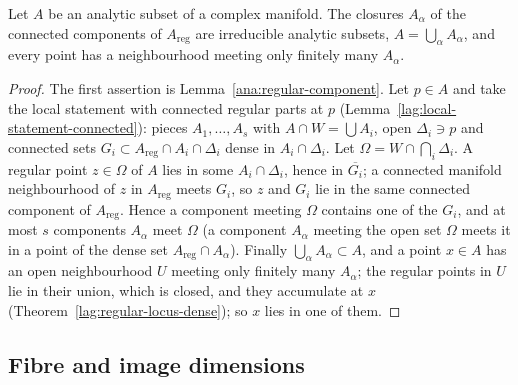 \begin{lemma}
\label{rem:global-components}
\leanok
Let \(A\) be an analytic subset of a complex manifold. The closures \(A_\alpha\) of the connected components of \(A_{\mathrm{reg}}\) are irreducible analytic
subsets, \(A=\bigcup_\alpha A_\alpha\), and every point has a neighbourhood meeting only finitely many \(A_\alpha\).
\end{lemma}
\begin{proof}
\leanok
The first assertion is Lemma~\ref{ana:regular-component}. Let \(p\in A\) and take the local statement
with connected regular parts at \(p\) (Lemma~\ref{lag:local-statement-connected}): pieces \(A_1,\dots,A_s\) with \(A\cap W=\bigcup A_i\), open \(\Delta_i\ni p\) and
connected sets \(G_i\subset A_{\mathrm{reg}}\cap A_i\cap\Delta_i\) dense in \(A_i\cap\Delta_i\). Let \(\Omega=W\cap\bigcap_i\Delta_i\). A regular point \(z\in\Omega\)
of \(A\) lies in some \(A_i\cap\Delta_i\), hence in \(\overline{G_i}\); a connected manifold neighbourhood of \(z\) in \(A_{\mathrm{reg}}\) meets \(G_i\), so \(z\) and
\(G_i\) lie in the same connected component of \(A_{\mathrm{reg}}\). Hence a component meeting \(\Omega\) contains one of the \(G_i\), and at most \(s\) components
\(A_\alpha\) meet \(\Omega\) (a component \(A_\alpha\) meeting the open set \(\Omega\) meets it in a point of the dense set \(A_{\mathrm{reg}}\cap A_\alpha\)).
Finally \(\bigcup_\alpha A_\alpha\subset A\), and a point \(x\in A\) has an open neighbourhood \(U\) meeting only finitely many \(A_\alpha\); the regular points in \(U\)
lie in their union, which is closed, and they accumulate at \(x\) (Theorem~\ref{lag:regular-locus-dense}); so \(x\) lies in one of them.
\end{proof}

\subsection{Fibre and image dimensions}

